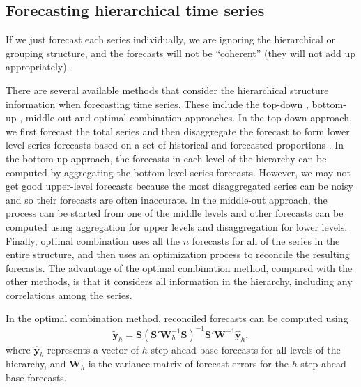 \documentclass[11pt,a4paper,]{article}
\begin{document}
\hypertarget{forecasting-hierarchical-time-series}{%
\subsection{Forecasting hierarchical time
series}\label{forecasting-hierarchical-time-series}}

If we just forecast each series individually, we are ignoring the
hierarchical or grouping structure, and the forecasts will not be
``coherent'' (they will not add up appropriately).

There are several available methods that consider the hierarchical
structure information when forecasting time series. These include the
top-down \autocite{gross1990disaggregation,fliedner2001hierarchical},
bottom-up \autocite{kahn1998revisiting}, middle-out and optimal
combination \autocite{hyndman2011optimal} approaches. In the top-down
approach, we first forecast the total series and then disaggregate the
forecast to form lower level series forecasts based on a set of
historical and forecasted proportions \autocite[for details
see][]{athanasopoulos2009hierarchical}. In the bottom-up approach, the
forecasts in each level of the hierarchy can be computed by aggregating
the bottom level series forecasts. However, we may not get good
upper-level forecasts because the most disaggregated series can be noisy
and so their forecasts are often inaccurate. In the middle-out approach,
the process can be started from one of the middle levels and other
forecasts can be computed using aggregation for upper levels and
disaggregation for lower levels. Finally, optimal combination uses all
the \(n\) forecasts for all of the series in the entire structure, and
then uses an optimization process to reconcile the resulting forecasts.
The advantage of the optimal combination method, compared with the other
methods, is that it considers all information in the hierarchy,
including any correlations among the series.

In the optimal combination method, reconciled forecasts can be computed
using \autocite{mint2018} \begin{equation}\label{eq:mint}
  \tilde{\bm{y}}_{h}=\bm{S}(\bm{S}'\bm{W}_h^{-1}\bm{S})^{-1}\bm{S}'\bm{W}^{-1}\hat{\bm{y}}_h,
\end{equation} where \(\hat{\bm{y}}_h\) represents a vector of
\(h\)-step-ahead base forecasts for all levels of the hierarchy, and
\(\bm{W}_h\) is the variance matrix of forecast errors for the
\(h\)-step-ahead base forecasts.
\end{document}
